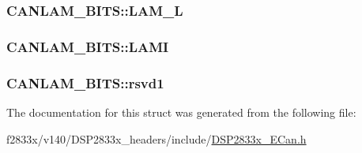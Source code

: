 \subsubsection[{L\+A\+M\+\_\+\+L}]{ C\+A\+N\+L\+A\+M\+\_\+\+B\+I\+T\+S\+::\+L\+A\+M\+\_\+\+L}\label{struct_c_a_n_l_a_m___b_i_t_s_aded7666b671ea3f7dfca691f6914a381}
\hypertarget{struct_c_a_n_l_a_m___b_i_t_s_a97fe962385bd127ca3fd695b3ba03475}{}
\subsubsection[{L\+A\+M\+I}]{ C\+A\+N\+L\+A\+M\+\_\+\+B\+I\+T\+S\+::\+L\+A\+M\+I}\label{struct_c_a_n_l_a_m___b_i_t_s_a97fe962385bd127ca3fd695b3ba03475}
\hypertarget{struct_c_a_n_l_a_m___b_i_t_s_a9ba6c8bcf2f6fa5b05718e5415bccc80}{}
\subsubsection[{rsvd1}]{ C\+A\+N\+L\+A\+M\+\_\+\+B\+I\+T\+S\+::rsvd1}\label{struct_c_a_n_l_a_m___b_i_t_s_a9ba6c8bcf2f6fa5b05718e5415bccc80}


The documentation for this struct was generated from the following file\+:\begin{DoxyCompactItemize}
\item 
f2833x/v140/\+D\+S\+P2833x\+\_\+headers/include/\hyperlink{_d_s_p2833x___e_can_8h}{D\+S\+P2833x\+\_\+\+E\+Can.\+h}\end{DoxyCompactItemize}
